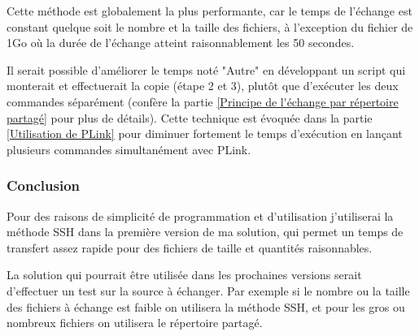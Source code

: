 Cette méthode est globalement la plus performante, car le temps de l'échange est constant quelque soit le nombre et la taille des fichiers, à l'exception du fichier de 1Go où la durée de l'échange atteint raisonnablement les 50 secondes.

Il serait possible d'améliorer le temps noté "Autre" en développant un script qui monterait et effectuerait la copie (étape 2 et 3), plutôt que d'exécuter les deux commandes séparément (confère la partie \ref{Principe de l'échange par répertoire partagé} pour plus de détails).
Cette technique est évoquée dans la partie \ref{Utilisation de PLink} pour diminuer fortement le temps d'exécution en lançant plusieurs commandes simultanément avec PLink.
\\




\subsubsection{Conclusion}

Pour des raisons de simplicité de programmation et d'utilisation j'utiliserai la méthode SSH dans la première version de ma solution, qui permet un temps de transfert assez rapide pour des fichiers de taille et quantités raisonnables.

La solution qui pourrait être utilisée dans les prochaines versions serait d'effectuer un test sur la source à échanger.
Par exemple si le nombre ou la taille des fichiers à échange est faible on utilisera la méthode SSH, et pour les gros ou nombreux fichiers on utilisera le répertoire partagé.
